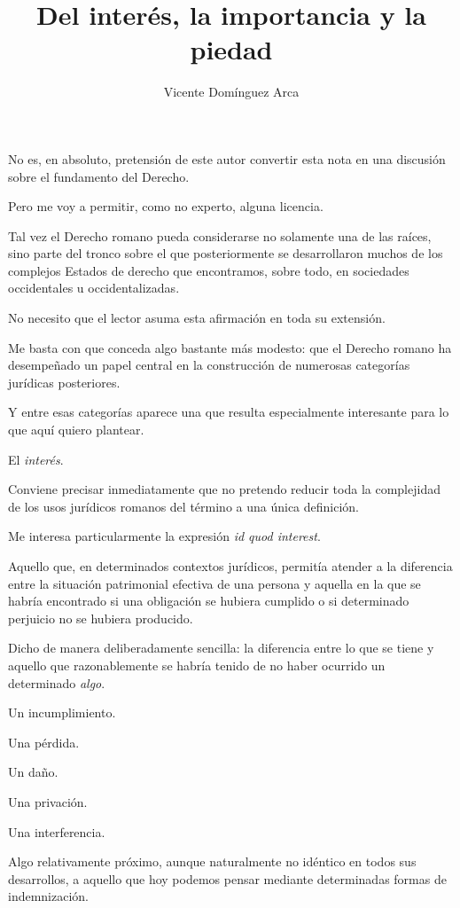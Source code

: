 \documentclass[12pt,a4paper]{article}
\title{Del interés, la importancia y la piedad}
\author{Vicente Domínguez Arca}
\date{}
\begin{document}
\maketitle

No es, en absoluto, pretensión de este autor convertir esta nota en una discusión sobre el fundamento del Derecho.

Pero me voy a permitir, como no experto, alguna licencia.

Tal vez el Derecho romano pueda considerarse no solamente una de las raíces, sino parte del tronco sobre el que posteriormente se desarrollaron muchos de los complejos Estados de derecho que encontramos, sobre todo, en sociedades occidentales u occidentalizadas.

No necesito que el lector asuma esta afirmación en toda su extensión.

Me basta con que conceda algo bastante más modesto: que el Derecho romano ha desempeñado un papel central en la construcción de numerosas categorías jurídicas posteriores.

Y entre esas categorías aparece una que resulta especialmente interesante para lo que aquí quiero plantear.

El \emph{interés}.

Conviene precisar inmediatamente que no pretendo reducir toda la complejidad de los usos jurídicos romanos del término a una única definición.

Me interesa particularmente la expresión \emph{id quod interest}.

Aquello que, en determinados contextos jurídicos, permitía atender a la diferencia entre la situación patrimonial efectiva de una persona y aquella en la que se habría encontrado si una obligación se hubiera cumplido o si determinado perjuicio no se hubiera producido.

Dicho de manera deliberadamente sencilla: la diferencia entre lo que se tiene y aquello que razonablemente se habría tenido de no haber ocurrido un determinado \emph{algo}.

Un incumplimiento.

Una pérdida.

Un daño.

Una privación.

Una interferencia.

Algo relativamente próximo, aunque naturalmente no idéntico en todos sus desarrollos, a aquello que hoy podemos pensar mediante determinadas formas de indemnización.
\end{document}
